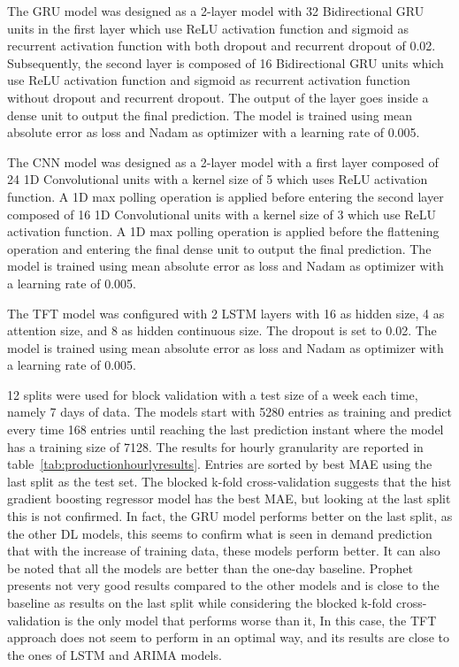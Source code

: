 The GRU model was designed as a 2-layer model with 32 Bidirectional GRU units in the first layer which use ReLU activation function and sigmoid as recurrent activation function with both dropout and recurrent dropout of 0.02.
Subsequently, the second layer is composed of 16 Bidirectional GRU units which use ReLU activation function and sigmoid as recurrent activation function without dropout and recurrent dropout.
The output of the layer goes inside a dense unit to output the final prediction.
The model is trained using mean absolute error as loss and Nadam as optimizer with a learning rate of 0.005.

The CNN model was designed as a 2-layer model with a first layer composed of 24 1D Convolutional units with a kernel size of 5 which uses ReLU activation function.
A 1D max polling operation is applied before entering the second layer composed of 16 1D Convolutional units with a kernel size of 3 which use ReLU activation function.
A 1D max polling operation is applied before the flattening operation and entering the final dense unit to output the final prediction.
The model is trained using mean absolute error as loss and Nadam as optimizer with a learning rate of 0.005.

The TFT model was configured with 2 LSTM layers with 16 as hidden size, 4 as attention size, and 8 as hidden continuous size.
The dropout is set to 0.02.
The model is trained using mean absolute error as loss and Nadam as optimizer with a learning rate of 0.005.

12 splits were used for block validation with a test size of a week each time, namely 7 days of data.
The models start with 5280 entries as training and predict every time 168 entries until reaching the last prediction instant where the model has a training size of 7128.
The results for hourly granularity are reported in table~\ref{tab:productionhourlyresults}.
Entries are sorted by best MAE using the last split as the test set.
The blocked k-fold cross-validation suggests that the hist gradient boosting regressor model has the best MAE, but looking at the last split this is not confirmed.
In fact, the GRU model performs better on the last split, as the other DL models, this seems to confirm what is seen in demand prediction that with the increase of training data, these models perform better.
It can also be noted that all the models are better than the one-day baseline.
Prophet presents not very good results compared to the other models and is close to the baseline as results on the last split while considering the blocked k-fold cross-validation is the only model that performs worse than it,
In this case, the TFT approach does not seem to perform in an optimal way, and its results are close to the ones of LSTM and ARIMA models.

